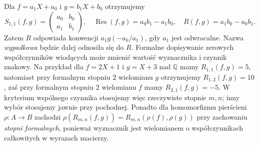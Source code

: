 \begin{uwaga}\label{aa:uw:res-sign}
Dla $f=a_1X+a_0$ i $g=b_1X+b_0$ otrzymujemy
\[
 S_{1,1}(f,g)=\begin{pmatrix}a_0&b_0\\a_1&b_1\end{pmatrix},\quad
 \operatorname{Res}(f,g)=a_0b_1-a_1b_0,\quad
 R(f,g)=a_1b_0-a_0b_1.
\]
Zatem $R$ odpowiada konwencji $a_1g(-a_0/a_1)$, gdy $a_1$
jest odwracalne. Nazwa \emph{wypadkowa} będzie dalej odnosiła się do $R$.
Formalne dopisywanie zerowych współczynników wiodących może zmienić
wartość wyznacznika i czynnik znakowy. Na przykład dla
$f=2X+1$ i $g=X+3$ nad $\mathbb Q$ mamy $R_{1,1}(f,g)=5$,
natomiast przy formalnym stopniu $2$ wielomianu $g$ otrzymujemy
$R_{1,2}(f,g)=10$, zaś przy formalnym stopniu $2$ wielomianu
$f$ mamy $R_{2,1}(f,g)=-5$. W kryterium wspólnego czynnika stosujemy więc
rzeczywiste stopnie $m,n$; inny wybór stosujemy jawnie przy pochodnej.
Ponadto dla homomorfizmu pierścieni $\rho:A\to B$ zachodzi
$\rho(R_{m,n}(f,g))=R_{m,n}(\rho(f),\rho(g))$ przy
zachowaniu \emph{stopni formalnych}, ponieważ wyznacznik jest
wielomianem o współczynnikach całkowitych w wyrazach macierzy.
\end{uwaga}

